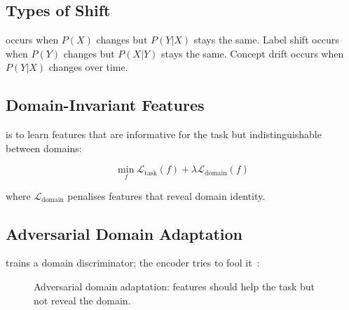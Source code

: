 
\subsection{Types of Shift}

 occurs when $P(X)$ changes but $P(Y|X)$ stays the same. Label shift occurs when $P(Y)$ changes but $P(X|Y)$ stays the same. Concept drift occurs when $P(Y|X)$ changes over time.

\subsection{Domain-Invariant Features}

 is to learn features that are informative for the task but indistinguishable between domains:

\begin{equation}
    \min_f \mathcal{L}_{\text{task}}(f) + \lambda \mathcal{L}_{\text{domain}}(f)
\end{equation}

where $\mathcal{L}_{\text{domain}}$ penalises features that reveal domain identity.

\subsection{Adversarial Domain Adaptation}

 trains a domain discriminator; the encoder tries to fool it~\cite{Ganin2016DomainAdversarial}:

\begin{figure}
\centering
{}
\caption{Adversarial domain adaptation: features should help the task but not reveal the domain.}
\label{fig:domain_adaptation}
\end{figure}


